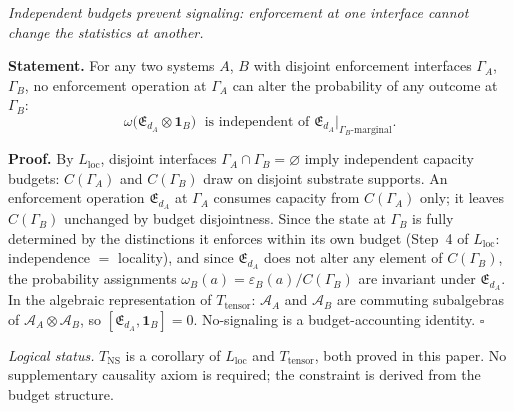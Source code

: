 \documentclass[11pt]{article}
\theoremstyle{remark}
\begin{document}
\begin{tcolorbox}[apfbox, title={Corollary: $T_{\mathrm{NS}}$ (No-Signaling from Budget Independence)}]
\textit{Independent budgets prevent signaling: enforcement at one interface cannot change the statistics at another.}

\smallskip\noindent\textbf{Statement.}  For any two systems $A$, $B$ with disjoint enforcement interfaces $\Gamma_A$, $\Gamma_B$, no enforcement operation at $\Gamma_A$ can alter the probability of any outcome at $\Gamma_B$:
\[
\omega\bigl(\mathfrak{E}_{d_A} \otimes \mathbf{1}_B\bigr) \;\text{ is independent of } \mathfrak{E}_{d_A}\bigl|_{\Gamma_B\text{-marginal}}.
\]

\smallskip\noindent\textbf{Proof.}  By $L_{\mathrm{loc}}$, disjoint interfaces $\Gamma_A \cap \Gamma_B = \varnothing$ imply independent capacity budgets: $C(\Gamma_A)$ and $C(\Gamma_B)$ draw on disjoint substrate supports.  An enforcement operation $\mathfrak{E}_{d_A}$ at $\Gamma_A$ consumes capacity from $C(\Gamma_A)$ only; it leaves $C(\Gamma_B)$ unchanged by budget disjointness.  Since the state at $\Gamma_B$ is fully determined by the distinctions it enforces within its own budget (Step~4 of $L_{\mathrm{loc}}$: independence $=$ locality), and since $\mathfrak{E}_{d_A}$ does not alter any element of $C(\Gamma_B)$, the probability assignments $\omega_B(a) = \varepsilon_B(a)/C(\Gamma_B)$ are invariant under $\mathfrak{E}_{d_A}$.  In the algebraic representation of $T_{\mathrm{tensor}}$: $\mathcal{A}_A$ and $\mathcal{A}_B$ are commuting subalgebras of $\mathcal{A}_A \otimes \mathcal{A}_B$, so $[\mathfrak{E}_{d_A}, \mathbf{1}_B] = 0$.  No-signaling is a budget-accounting identity.  \hfill$\square$

\smallskip\noindent\textit{Logical status.}  $T_{\mathrm{NS}}$ is a corollary of $L_{\mathrm{loc}}$ and $T_{\mathrm{tensor}}$, both proved in this paper.  No supplementary causality axiom is required; the constraint is derived from the budget structure.
\end{tcolorbox}
\end{document}
